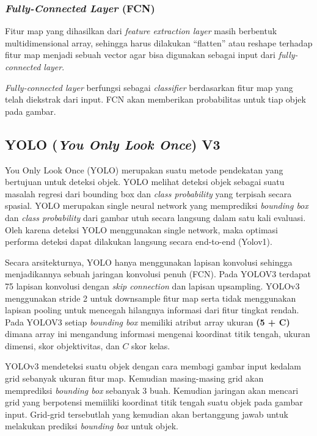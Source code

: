 \documentclass[../thesis.tex]{subfiles}
\begin{document}
\subsubsection{\textit{Fully-Connected Layer} (FCN)}
Fitur map yang dihasilkan dari \textit{feature extraction layer} masih berbentuk multidimensional array, sehingga harus dilakukan “flatten” atau reshape terhadap fitur map menjadi sebuah vector agar bisa digunakan sebagai input dari \textit{fully-connected layer}.

\textit{Fully-connected layer} berfungsi sebagai \textit{classifier} berdasarkan fitur map yang telah diekstrak dari input. FCN akan memberikan probabilitas untuk tiap objek pada gambar.

\subsection{YOLO (\textit{You Only Look Once}) V3}

You Only Look Once (YOLO) merupakan suatu metode pendekatan yang bertujuan untuk deteksi objek. YOLO melihat deteksi objek sebagai suatu masalah regresi dari bounding box dan
\textit{class probability} yang terpisah secara spasial. YOLO merupakan single neural network yang memprediksi \textit{bounding box} dan \textit{class probability} dari gambar utuh secara langsung dalam satu kali
evaluasi. Oleh karena deteksi YOLO menggunakan single network, maka optimasi performa deteksi dapat dilakukan langsung secara end-to-end (Yolov1).

Secara arsitekturnya, YOLO hanya menggunakan lapisan konvolusi sehingga menjadikannya sebuah jaringan konvolusi penuh (FCN). Pada YOLOV3 terdapat 75 lapisan konvolusi dengan \textit{skip connection} dan lapisan upsampling.
YOLOv3 menggunakan stride 2 untuk downsample fitur map serta tidak menggunakan lapisan pooling untuk mencegah hilangnya informasi dari fitur tingkat rendah. Pada YOLOV3 setiap \textit{bounding box} memiliki atribut array ukuran \textbf{(5 + C)} dimana array ini mengandung informasi
mengenai koordinat titik tengah, ukuran dimensi, skor objektivitas, dan $C$ skor kelas.

YOLOv3 mendeteksi suatu objek dengan cara membagi gambar input kedalam grid sebanyak ukuran fitur map. Kemudian masing-masing grid akan memprediksi \textit{bounding box} sebanyak 3 buah.
Kemudian jaringan akan mencari grid yang berpotensi memiiliki koordinat titik tengah suatu objek pada gambar input. Grid-grid tersebutlah yang kemudian akan bertanggung jawab untuk melakukan prediksi \textit{bounding box} untuk objek.
\end{document}
